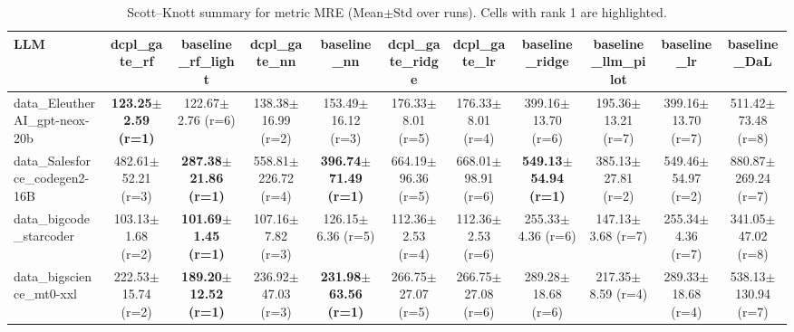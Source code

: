 \begin{table}[t]
\centering
\small
\caption{Scott--Knott summary for metric MRE (Mean$\pm$Std over runs). Cells with rank 1 are highlighted.}
\label{tab:sk_mre}
\setlength{\tabcolsep}{4pt}
\renewcommand{\arraystretch}{1.15}
\begin{tabular}{lcccccccccc}
\toprule
LLM & dcpl\_gate\_rf & baseline\_rf\_light & dcpl\_gate\_nn & baseline\_nn & dcpl\_gate\_ridge & dcpl\_gate\_lr & baseline\_ridge & baseline\_llm\_pilot & baseline\_lr & baseline\_DaL \\
\midrule
data\_EleutherAI\_gpt-neox-20b & \cellcolor{red!15}\textbf{123.25$\pm$2.59 {\scriptsize (r=1)}} & 122.67$\pm$2.76 {\scriptsize (r=6)} & 138.38$\pm$16.99 {\scriptsize (r=2)} & 153.49$\pm$16.12 {\scriptsize (r=3)} & 176.33$\pm$8.01 {\scriptsize (r=5)} & 176.33$\pm$8.01 {\scriptsize (r=4)} & 399.16$\pm$13.70 {\scriptsize (r=6)} & 195.36$\pm$13.21 {\scriptsize (r=7)} & 399.16$\pm$13.70 {\scriptsize (r=7)} & 511.42$\pm$73.48 {\scriptsize (r=8)} \\
data\_Salesforce\_codegen2-16B & 482.61$\pm$52.21 {\scriptsize (r=3)} & \cellcolor{red!15}\textbf{287.38$\pm$21.86 {\scriptsize (r=1)}} & 558.81$\pm$226.72 {\scriptsize (r=4)} & \cellcolor{red!15}\textbf{396.74$\pm$71.49 {\scriptsize (r=1)}} & 664.19$\pm$96.36 {\scriptsize (r=5)} & 668.01$\pm$98.91 {\scriptsize (r=6)} & \cellcolor{red!15}\textbf{549.13$\pm$54.94 {\scriptsize (r=1)}} & 385.13$\pm$27.81 {\scriptsize (r=2)} & 549.46$\pm$54.97 {\scriptsize (r=2)} & 880.87$\pm$269.24 {\scriptsize (r=7)} \\
data\_bigcode\_starcoder & 103.13$\pm$1.68 {\scriptsize (r=2)} & \cellcolor{red!15}\textbf{101.69$\pm$1.45 {\scriptsize (r=1)}} & 107.16$\pm$7.82 {\scriptsize (r=3)} & 126.15$\pm$6.36 {\scriptsize (r=5)} & 112.36$\pm$2.53 {\scriptsize (r=4)} & 112.36$\pm$2.53 {\scriptsize (r=6)} & 255.33$\pm$4.36 {\scriptsize (r=6)} & 147.13$\pm$3.68 {\scriptsize (r=7)} & 255.34$\pm$4.36 {\scriptsize (r=7)} & 341.05$\pm$47.02 {\scriptsize (r=8)} \\
data\_bigscience\_mt0-xxl & 222.53$\pm$15.74 {\scriptsize (r=2)} & \cellcolor{red!15}\textbf{189.20$\pm$12.52 {\scriptsize (r=1)}} & 236.92$\pm$47.03 {\scriptsize (r=3)} & \cellcolor{red!15}\textbf{231.98$\pm$63.56 {\scriptsize (r=1)}} & 266.75$\pm$27.07 {\scriptsize (r=5)} & 266.75$\pm$27.08 {\scriptsize (r=6)} & 289.28$\pm$18.68 {\scriptsize (r=6)} & 217.35$\pm$8.59 {\scriptsize (r=4)} & 289.33$\pm$18.68 {\scriptsize (r=4)} & 538.13$\pm$130.94 {\scriptsize (r=7)} \\

\end{tabular}
\end{table}
